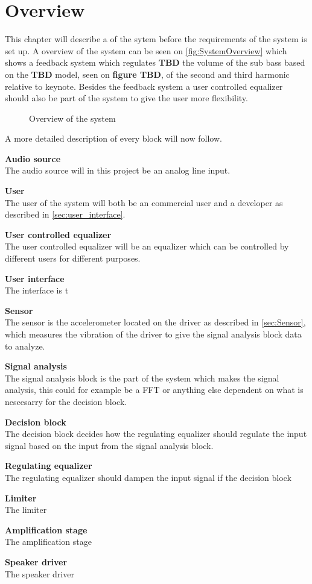 \chapter{Overview} \label{ch:overview}
This chapter will describe a of the sytem before the requirements of the system is set up. A overview of the system can be seen on \autoref{fig:SystemOverview} which shows a feedback system which regulates \textbf{TBD} the volume of the sub bass based on the \textbf{TBD} model, seen on \textbf{figure TBD}, of the second and third harmonic relative to keynote. Besides the feedback system a user controlled equalizer should also be part of the system to give the user more flexibility.            

\begin{figure}[H]
\centering
{}
\scalebox{0.8}{
}
\caption{Overview of the system}
\label{fig:SystemOverview}
\end{figure}

A more detailed description of every block will now follow.

\textbf{Audio source} \\
The audio source will in this project be an analog line input. 

\textbf{User} \\
The user of the system will both be an commercial user and a developer as described in \autoref{sec:user_interface}. 

\textbf{User controlled equalizer}\\
The user controlled equalizer will be an equalizer which can be controlled by different users for different purposes.

\textbf{User interface} \\
The interface is t 

\textbf{Sensor} \\
The sensor is the accelerometer located on the driver as described in \autoref{sec:Sensor}, which measures the vibration of the driver to give the signal analysis block data to analyze. 

\textbf{Signal analysis} \\
The signal analysis block is the part of the system which makes the signal analysis, this could for example be a FFT or anything else dependent on what is nescesarry for the decision block.

\textbf{Decision block} \\
The decision block decides how the regulating equalizer should regulate the input signal based on the input from the signal analysis block. 

\textbf{Regulating equalizer} \\
The regulating equalizer should dampen the input signal if the decision block 

\textbf{Limiter} \\
The limiter

\textbf{Amplification stage} \\
The amplification stage

\textbf{Speaker driver} \\
The speaker driver

